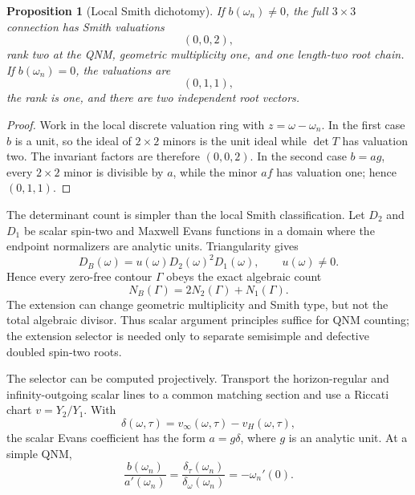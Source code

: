 \documentclass[11pt]{article}
\newtheorem{proposition}[theorem]{Proposition}
\theoremstyle{definition}
\theoremstyle{remark}
\begin{document}
\begin{proposition}[Local Smith dichotomy]
\label{prop:smith}
If \(b(\omega_n)\neq0\), the full \(3\times3\) connection has Smith
valuations
\[
(0,0,2),
\]
rank two at the QNM, geometric multiplicity one, and one length-two root
chain.  If \(b(\omega_n)=0\), the valuations are
\[
(0,1,1),
\]
the rank is one, and there are two independent root vectors.
\end{proposition}

\begin{proof}
Work in the local discrete valuation ring with
\(z=\omega-\omega_n\).  In the first case \(b\) is a unit, so the ideal of
\(2\times2\) minors is the unit ideal while
\(\det T\) has valuation two.  The invariant factors are therefore
\((0,0,2)\).  In the second case \(b=ag\), every \(2\times2\) minor is
divisible by \(a\), while the minor \(af\) has valuation one; hence
\((0,1,1)\).
\end{proof}

The determinant count is simpler than the local Smith classification.  Let
\(D_2\) and \(D_1\) be scalar spin-two and Maxwell Evans functions in a
domain where the endpoint normalizers are analytic units.  Triangularity
gives
\begin{equation}
\label{eq:qnm-count-factorization}
D_B(\omega)=u(\omega)D_2(\omega)^2D_1(\omega),
\qquad u(\omega)\ne0 .
\end{equation}
Hence every zero-free contour \(\Gamma\) obeys the exact algebraic count
\begin{equation}
\label{eq:qnm-count}
N_B(\Gamma)=2N_2(\Gamma)+N_1(\Gamma).
\end{equation}
The extension can change geometric multiplicity and Smith type, but not the
total algebraic divisor.  Thus scalar argument principles suffice for QNM
counting; the extension selector is needed only to separate semisimple and
defective doubled spin-two roots.

The selector can be computed projectively.  Transport the horizon-regular
and infinity-outgoing scalar lines to a common matching section and use a
Riccati chart \(v=Y_2/Y_1\).  With
\[
\delta(\omega,\tau)=v_\infty(\omega,\tau)-v_H(\omega,\tau),
\]
the scalar Evans coefficient has the form \(a=g\delta\), where \(g\) is an
analytic unit.  At a simple QNM,
\begin{equation}
\label{eq:velocity}
\frac{b(\omega_n)}{a'(\omega_n)}
=
\frac{\delta_\tau(\omega_n)}{\delta_\omega(\omega_n)}
=-\omega_n'(0).
\end{equation}
\end{document}

